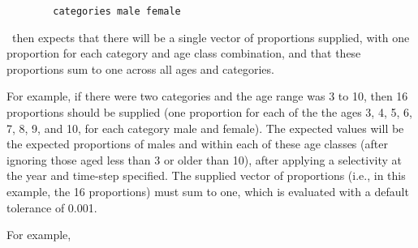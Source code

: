 {\small{\begin{verbatim}
		categories male female
		\end{verbatim}}}

\CNAME\ then expects that there will be a single vector of proportions supplied, with one proportion for each category and age class combination, and that these proportions sum to one across all ages and categories.

For example, if there were two categories and the age range was 3 to 10, then 16 proportions should be supplied (one proportion for each of the the ages 3, 4, 5, 6, 7, 8, 9, and 10, for each category male and female). The expected values will be the expected proportions of males and within each of these age classes (after ignoring those aged less than 3 or older than 10), after applying a selectivity at the year and time-step specified. The supplied vector of proportions (i.e., in this example, the 16 proportions) must sum to one, which is evaluated with a default tolerance of 0.001. 

For example,

